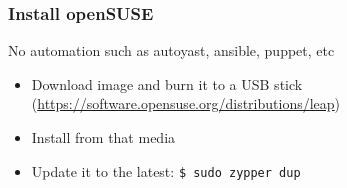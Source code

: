 \documentclass[aspectratio=169,11pt,hyperref={colorlinks=true}]{beamer}
\begin{document}
\begin{frame}
  \frametitle{Install openSUSE}
  No automation such as autoyast, ansible, puppet, etc
  \begin{itemize}
    \item Download image and burn it to a USB stick (\url{https://software.opensuse.org/distributions/leap})
    \item Install from that media
    \item Update it to the latest: \texttt{\$ sudo zypper dup}
  \end{itemize}
\end{frame}
\end{document}
